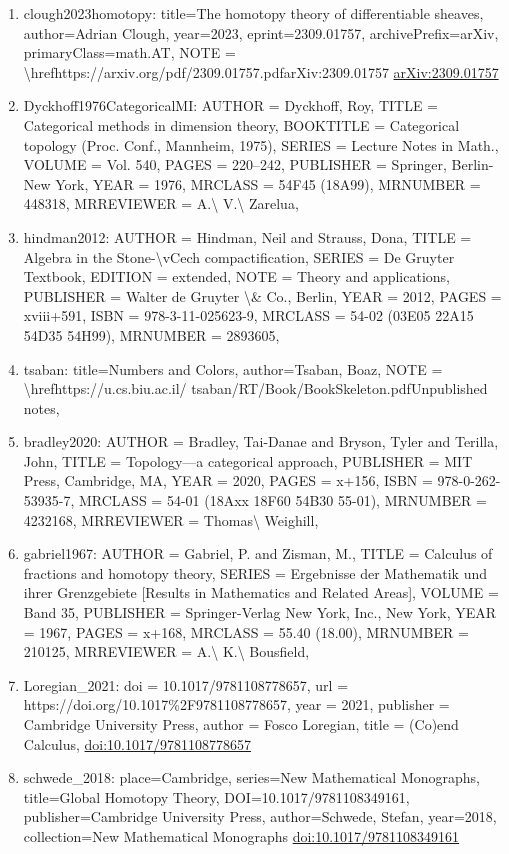 \documentclass[11pt]{article}
\begin{document}
\begin{enumerate}[leftmargin=*]
  \item clough2023homotopy: title=The homotopy theory of differentiable sheaves, author=Adrian Clough, year=2023, eprint=2309.01757, archivePrefix=arXiv, primaryClass=math.AT, NOTE = \textbackslash{}hrefhttps://arxiv.org/pdf/2309.01757.pdfarXiv:2309.01757 \href{https://arxiv.org/abs/2309.01757}{arXiv:2309.01757}
  \item Dyckhoff1976CategoricalMI: AUTHOR = Dyckhoff, Roy, TITLE = Categorical methods in dimension theory, BOOKTITLE = Categorical topology (Proc. Conf., Mannheim, 1975), SERIES = Lecture Notes in Math., VOLUME = Vol. 540, PAGES = 220--242, PUBLISHER = Springer, Berlin-New York, YEAR = 1976, MRCLASS = 54F45 (18A99), MRNUMBER = 448318, MRREVIEWER = A.\textbackslash{} V.\textbackslash{} Zarelua,
  \item hindman2012: AUTHOR = Hindman, Neil and Strauss, Dona, TITLE = Algebra in the Stone-\textbackslash{}vCech compactification, SERIES = De Gruyter Textbook, EDITION = extended, NOTE = Theory and applications, PUBLISHER = Walter de Gruyter \textbackslash{}\& Co., Berlin, YEAR = 2012, PAGES = xviii+591, ISBN = 978-3-11-025623-9, MRCLASS = 54-02 (03E05 22A15 54D35 54H99), MRNUMBER = 2893605,
  \item tsaban: title=Numbers and Colors, author=Tsaban, Boaz, NOTE = \textbackslash{}hrefhttps://u.cs.biu.ac.il/ tsaban/RT/Book/BookSkeleton.pdfUnpublished notes,
  \item bradley2020: AUTHOR = Bradley, Tai-Danae and Bryson, Tyler and Terilla, John, TITLE = Topology---a categorical approach, PUBLISHER = MIT Press, Cambridge, MA, YEAR = 2020, PAGES = x+156, ISBN = 978-0-262-53935-7, MRCLASS = 54-01 (18Axx 18F60 54B30 55-01), MRNUMBER = 4232168, MRREVIEWER = Thomas\textbackslash{} Weighill,
  \item gabriel1967: AUTHOR = Gabriel, P. and Zisman, M., TITLE = Calculus of fractions and homotopy theory, SERIES = Ergebnisse der Mathematik und ihrer Grenzgebiete [Results in Mathematics and Related Areas], VOLUME = Band 35, PUBLISHER = Springer-Verlag New York, Inc., New York, YEAR = 1967, PAGES = x+168, MRCLASS = 55.40 (18.00), MRNUMBER = 210125, MRREVIEWER = A.\textbackslash{} K.\textbackslash{} Bousfield,
  \item Loregian\_2021: doi = 10.1017/9781108778657, url = https://doi.org/10.1017\%2F9781108778657, year = 2021, publisher = Cambridge University Press, author = Fosco Loregian, title = (Co)end Calculus, \href{https://doi.org/10.1017/9781108778657}{doi:10.1017/9781108778657}
  \item schwede\_2018: place=Cambridge, series=New Mathematical Monographs, title=Global Homotopy Theory, DOI=10.1017/9781108349161, publisher=Cambridge University Press, author=Schwede, Stefan, year=2018, collection=New Mathematical Monographs \href{https://doi.org/10.1017/9781108349161}{doi:10.1017/9781108349161}

\end{enumerate}
\end{document}

